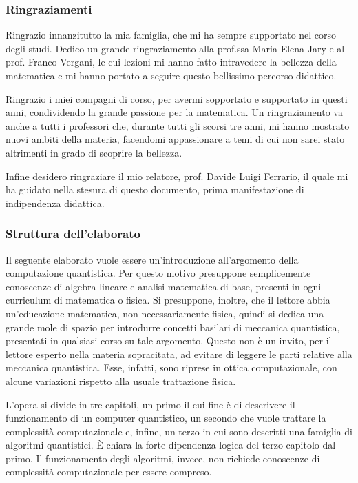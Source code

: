 \begin{center}
 \subsubsection*{Ringraziamenti}
\end{center}
Ringrazio innanzitutto la mia famiglia, che mi ha sempre supportato nel corso degli studi.
Dedico un grande ringraziamento alla prof.ssa Maria Elena Jary e al prof. Franco Vergani, le cui lezioni mi hanno fatto intravedere la bellezza della matematica e mi hanno portato a seguire questo bellissimo percorso didattico.

Ringrazio i miei compagni di corso, per avermi sopportato e supportato in questi anni, condividendo la grande passione per la matematica.
Un ringraziamento va anche a tutti i professori che, durante tutti gli scorsi tre anni, mi hanno mostrato nuovi ambiti della materia, facendomi appassionare a temi di cui non sarei stato altrimenti in grado di scoprire la bellezza.

Infine desidero ringraziare il mio relatore, prof. Davide Luigi Ferrario, il quale mi ha guidato nella stesura di questo documento, prima manifestazione di indipendenza didattica.

\newpage
\begin{center}
 \subsubsection*{Struttura dell'elaborato}
\end{center}
Il seguente elaborato vuole essere un'introduzione all'argomento della computazione quantistica.
Per questo motivo presuppone semplicemente conoscenze di algebra lineare e analisi matematica di base, presenti in ogni curriculum di matematica o fisica.
Si presuppone, inoltre, che il lettore abbia un'educazione matematica, non necessariamente fisica, quindi si dedica una grande mole di spazio per introdurre concetti basilari di meccanica quantistica, presentati in qualsiasi corso su tale argomento.
Questo non è un invito, per il lettore esperto nella materia sopracitata, ad evitare di leggere le parti relative alla meccanica quantistica.
Esse, infatti, sono riprese in ottica computazionale, con alcune variazioni rispetto alla usuale trattazione fisica.

L'opera si divide in tre capitoli, un primo il cui fine è di descrivere il funzionamento di un computer quantistico, un secondo che vuole trattare la complessità computazionale e, infine, un terzo in cui sono descritti una famiglia di algoritmi quantistici.
È chiara la forte dipendenza logica del terzo capitolo dal primo.
Il funzionamento degli algoritmi, invece, non richiede conoscenze di complessità computazionale per essere compreso.

